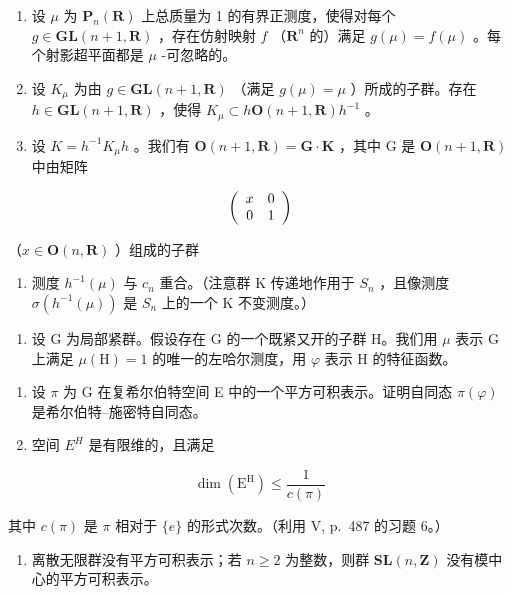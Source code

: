 \begin{enumerate}
\def\labelenumi{\alph{enumi})}
\setcounter{enumi}{4}
\item
  设 \(\mu\) 为 \(\mathbf{P}_n(\mathbf{R})\) 上总质量为 1 的有界正测度，使得对每个 \(g \in \mathbf{GL}(n + 1, \mathbf{R})\) ，存在仿射映射 \(f\) （\(\mathbf{R}^n\) 的）满足 \(g(\mu) = f(\mu)\) 。每个射影超平面都是 \(\mu\) -可忽略的。
\item
  设 \(K_{\mu}\) 为由 \(g \in \mathbf{GL}(n+1, \mathbf{R})\) （满足 \(g(\mu) = \mu\) ）所成的子群。存在 \(h \in \mathbf{GL}(n+1, \mathbf{R})\) ，使得 \(K_{\mu} \subset h \mathbf{O}(n+1, \mathbf{R}) h^{-1}\) 。
\item
  设 \(K = h^{-1}K_{\mu}h\) 。我们有 \(\mathbf{O}(n + 1, \mathbf{R}) = \mathbf{G} \cdot \mathbf{K}\) ，其中 G 是 \(\mathbf{O}(n + 1, \mathbf{R})\) 中由矩阵
\end{enumerate}

\[
\left( \begin{array}{c c} x & 0 \\ 0 & 1 \end{array} \right)
\]

（\(x\in \mathbf{O}(n,\mathbf{R})\) ）组成的子群

\begin{enumerate}
\def\labelenumi{\alph{enumi})}
\setcounter{enumi}{7}
\tightlist
\item
  测度 \(h^{-1}(\mu)\) 与 \(c_{n}\) 重合。（注意群 K 传递地作用于 \(S_{n}\) ，且像测度 \(\sigma(h^{-1}(\mu))\) 是 \(S_{n}\) 上的一个 K 不变测度。）
\end{enumerate}

\begin{enumerate}
\def\labelenumi{\arabic{enumi})}
\setcounter{enumi}{31}
\tightlist
\item
  设 G 为局部紧群。假设存在 G 的一个既紧又开的子群 H。我们用 \(\mu\) 表示 G 上满足 \(\mu(\mathrm{H}) = 1\) 的唯一的左哈尔测度，用 \(\varphi\) 表示 H 的特征函数。
\end{enumerate}

\begin{enumerate}
\def\labelenumi{\alph{enumi})}
\item
  设 \(\pi\) 为 G 在复希尔伯特空间 E 中的一个平方可积表示。证明自同态 \(\pi(\varphi)\) 是希尔伯特–施密特自同态。
\item
  空间 \(E^{H}\) 是有限维的，且满足
\end{enumerate}

\[
\dim (\mathrm{E} ^ {\mathrm{H}}) \leqslant \frac {1}{c (\pi)}
\]

其中 \(c(\pi)\) 是 \(\pi\) 相对于 \(\{e\}\) 的形式次数。（利用 V, p.~487 的习题 6。）

\begin{enumerate}
\def\labelenumi{\alph{enumi})}
\setcounter{enumi}{2}
\tightlist
\item
  离散无限群没有平方可积表示；若 \(n \geqslant 2\) 为整数，则群 \(\mathbf{SL}(n, \mathbf{Z})\) 没有模中心的平方可积表示。
\end{enumerate}

